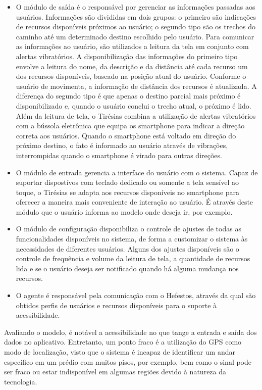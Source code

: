 \documentclass[english,brazilian]{UNISINOSmonografia}
\begin{document}
\begin{itemize}
	\item O módulo de saída é o responsável por gerenciar as informações passadas aos usuários. Informações são divididas em dois grupos: o primeiro são indicações de recursos disponíveis próximos ao usuário; o segundo tipo são os trechos do caminho até um determinado destino escolhido pelo usuário. Para comunicar as informações ao usuário, são utilizados a leitura da tela em conjunto com alertas vibratórios. A disponibilização das informações do primeiro tipo envolve a leitura do nome, da descrição e da distância até cada recurso um dos recursos disponíveis, baseado na posição atual do usuário. Conforme o usuário de movimenta, a informação de distância dos recursos é atualizada. A diferença do segundo tipo é que apenas o destino parcial mais próximo é disponibilizado e, quando o usuário conclui o trecho atual, o próximo é lido. Além da leitura de tela, o Tirésias combina a utilização de alertas vibratórios com a bússola eletrônica que equipa os smartphone para indicar a direção correta aos usuários. Quando o smartphone está voltado em direção do próximo destino, o fato é informado ao usuário através de vibrações, interrompidas quando o smartphone é virado para outras direções.

	\item O módulo de entrada gerencia a interface do usuário com o sistema. Capaz de suportar dispostívos com teclado dedicado ou somente a tela sensível ao toque, o Tirésias se adapta aos recursos disponíveis no smartphone para oferecer a maneira mais conveniente de interação ao usuário. É através deste módulo que o usuário informa ao modelo onde deseja ir, por exemplo.

	\item O módulo de configuração disponibiliza o controle de ajustes de todas as funcionalidades disponíveis no sistema, de forma a customizar o sistema às necessidades de diferentes usuários. Alguns dos ajustes disponíveis são o controle de frequência e volume da leitura de tela, a quantidade de recursos lida e se o usuário deseja ser notificado quando há alguma mudança nos recursos.

	\item O agente é responsável pela comunicação com o Hefestos, através da qual são obtidos perfis de usuários e recursos disponíveis para o suporte à acessibilidade.
\end{itemize} 

Avaliando o modelo, é notável a acessibilidade no que tange a entrada e saída dos dados no aplicativo. Entretanto, um ponto fraco é a utilização do GPS como modo de localização, visto que o sistema é incapaz de identificar um andar específico em um prédio com muitos pisos, por exemplo, bem como o sinal pode ser fraco ou estar indisponível em algumas regiões devido à natureza da tecnologia. 
\end{document}

